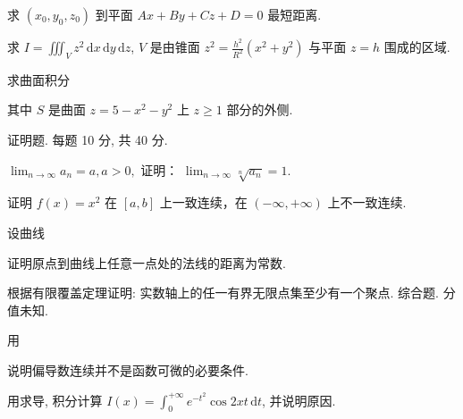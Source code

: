 求 $(x_0, y_0, z_0)$ 到平面 $Ax + By + Cz + D = 0$ 最短距离.\par
求 $I = \iiint_{V} z^{2} \, \mathrm{d}x \, \mathrm{d}y \, \mathrm{d}z$, $V$ 是由锥面 $z^{2} = \frac{h^{2}}{R^{2}} (x^{2} + y^{2})$ 与平面 $z = h$ 围成的区域.\par
\par{}
求曲面积分\par
\nopagebreak[4]
其中 $S$ 是曲面 $z = 5 - x^{2} - y^{2}$ 上 $z \geq 1$ 部分的外侧.\par
\par{}
证明题. 每题 10 分, 共 40 分.\par
$\lim_{n\to \infty}a_n = a,a > 0,$ 证明： $\lim_{n\to \infty}\sqrt[n]{a_n} = 1.$\par
证明 $f(x) = x^2$ 在 $[a, b]$ 上一致连续，在 $(- \infty, +\infty)$ 上不一致连续.\par
\par{}
设曲线\par
\nopagebreak[4]
证明原点到曲线上任意一点处的法线的距离为常数.\par
根据有限覆盖定理证明: 实数轴上的任一有界无限点集至少有一个聚点.
综合题. 分值未知.\par
\par{}
用\par
\nopagebreak[4]
说明偏导数连续并不是函数可微的必要条件.\par
用求导, 积分计算 $I(x) = \int_{0}^{+\infty} e^{-t^2} \cos 2xt \, \mathrm{d}t$, 并说明原因.\par
